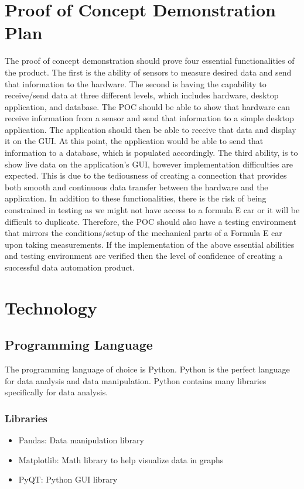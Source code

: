 \documentclass{article}
\begin{document}
\section{Proof of Concept Demonstration Plan}

The proof of concept demonstration should prove four essential 
functionalities of the product. The first is the ability of sensors to measure 
desired data and send that information to the hardware. The second is having the capability to receive/send 
data at three different levels, which includes hardware, desktop application, and database. 
The POC should be able to show that hardware can receive information from a sensor and send that 
information to a simple desktop application. The application should then be able to receive that 
data and display it on the GUI. At this point, the application would be able to send that 
information to a database, which is populated accordingly. The third ability, 
is to show live data on the application’s GUI, however implementation difficulties are expected. 
This is due to the tediousness of creating a connection that provides both smooth and continuous 
data transfer between the hardware and the application. In addition to these functionalities, there 
is the risk of being constrained in testing as we might not have access to a formula E car or it will 
be difficult to duplicate. Therefore, the POC should also have a testing environment that mirrors the 
conditions/setup of the mechanical parts of a Formula E car upon taking measurements. If the implementation of 
the above essential abilities and testing environment are verified then the level of confidence of creating 
a successful data automation product. 

\section{Technology}

\subsection{Programming Language}

The programming language of choice is Python. Python is the perfect language for data analysis and data manipulation. Python contains many libraries specifically for data analysis. 

\subsubsection{Libraries}
\begin{itemize}
	\item Pandas: Data manipulation library
	\item Matplotlib: Math library to help visualize data in graphs
	\item PyQT: Python GUI library
\end{itemize}
\end{document}
